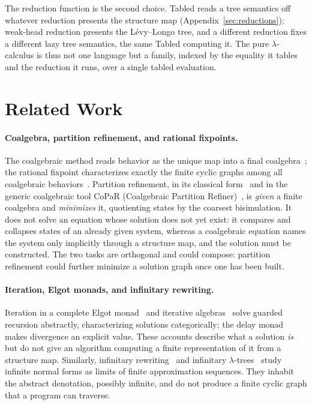 The reduction function is the second choice. \textsf{Tabled} reads a tree semantics off whatever reduction presents the structure map (Appendix~\ref{sec:reductions}); weak-head reduction presents the L\'evy--Longo tree, and a different reduction fixes a different lazy tree semantics, the same \textsf{Tabled} computing it. The pure $\lambda$-calculus is thus not one language but a family, indexed by the equality it tables and the reduction it runs, over a single tabled evaluation.

\section{Related Work}\label{sec:related}

\paragraph{Coalgebra, partition refinement, and rational fixpoints.}
The coalgebraic method reads behavior as the unique map into a final coalgebra~\cite{rutten2000-universal-coalgebra}; the rational fixpoint characterizes exactly the finite cyclic graphs among all coalgebraic behaviors~\cite{adamek2006-iterative-algebras}. Partition refinement, in its classical form~\cite{hopcroft1971-minimizing, paige1987-partition} and in the generic coalgebraic tool CoPaR (Coalgebraic Partition Refiner)~\cite{copar,wissmann-modular-partition-refinement}, is \emph{given} a finite coalgebra and \emph{minimizes} it, quotienting states by the coarsest bisimulation. It does not solve an equation whose solution does not yet exist: it compares and collapses states of an already given system, whereas a coalgebraic equation names the system only implicitly through a structure map, and the solution must be constructed. The two tasks are orthogonal and could compose: partition refinement could further minimize a solution graph once one has been built.

\paragraph{Iteration, Elgot monads, and infinitary rewriting.}
Iteration in a complete Elgot monad~\cite{goncharov2016-complete-elgot-monads} and iterative algebras~\cite{adamek2006-iterative-algebras} solve guarded recursion abstractly, characterizing solutions categorically; the delay monad~\cite{capretta2005-general-recursion} makes divergence an explicit value. These accounts describe what a solution \emph{is} but do not give an algorithm computing a finite representation of it from a structure map. Similarly, infinitary rewriting~\cite{kennaway-klop-sleep-devries} and infinitary $\lambda$-trees~\cite{berarducci} study infinite normal forms as limits of finite approximation sequences. They inhabit the abstract denotation, possibly infinite, and do not produce a finite cyclic graph that a program can traverse.

